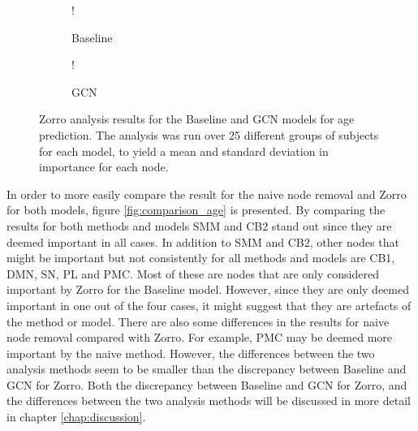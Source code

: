 \begin{figure}[H]
    \centering
        \begin{subfigure}{.5\textwidth}
            \centering
            \begin{center}
                \resizebox {1.0\linewidth} {!} {
                    
                }
            \end{center}
            \caption{Baseline}
            \label{fig:zorro_age_baseline}
        \end{subfigure}%
        \begin{subfigure}{.5\textwidth}
            \centering
            \begin{center}
                \resizebox {1.0\linewidth} {!} {
                    
                }
            \end{center}
            \caption{GCN}
            \label{fig:zorro_age_gcn}
        \end{subfigure}
    \caption{Zorro analysis results for the Baseline and GCN models for age prediction. The analysis was run over 25 different groups of subjects for each model, to yield a mean and standard deviation in importance for each node.}
    \label{fig:zorro_age}
\end{figure}


In order to more easily compare the result for the naive node removal and Zorro for both models, figure \ref{fig:comparison_age} is presented. By comparing the results for both methods and models SMM and CB2 stand out since they are deemed important in all cases. In addition to SMM and CB2, other nodes that might be important but not consistently for all methods and models are CB1, DMN, SN, PL and PMC. Most of these are nodes that are only considered important by Zorro for the Baseline model. However, since they are only deemed important in one out of the four cases, it might suggest that they are artefacts of the method or model.
There are also some differences in the results for naive node removal compared with Zorro. For example, PMC may be deemed more important by the naive method. However, the differences between the two analysis methods seem to be smaller than the discrepancy between Baseline and GCN for Zorro. Both the discrepancy between Baseline and GCN for Zorro, and the differences between the two analysis methods will be discussed in more detail in chapter \ref{chap:discussion}.

